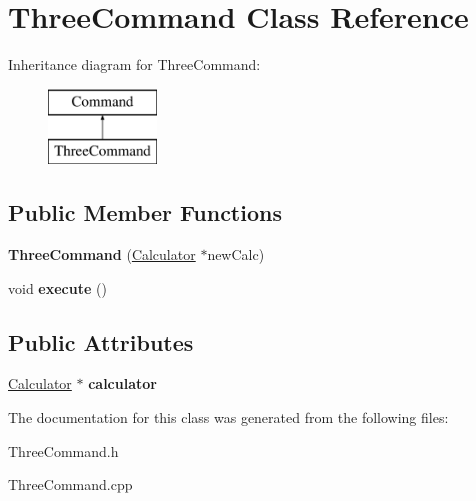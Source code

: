 \hypertarget{class_three_command}{}\section{Three\+Command Class Reference}
\label{class_three_command}
Inheritance diagram for Three\+Command\+:\begin{figure}[H]
\begin{center}
\leavevmode
\includegraphics[height=2.000000cm]{class_three_command}
\end{center}
\end{figure}
\subsection*{Public Member Functions}
\begin{DoxyCompactItemize}
\item 
\hypertarget{class_three_command_a6d1887ffb18cd3772b9164d68e86b72c}{}{\bfseries Three\+Command} (\hyperlink{class_calculator}{Calculator} $\ast$new\+Calc)\label{class_three_command_a6d1887ffb18cd3772b9164d68e86b72c}

\item 
\hypertarget{class_three_command_af8e301161be213f999f4fd49ffa4db67}{}void {\bfseries execute} ()\label{class_three_command_af8e301161be213f999f4fd49ffa4db67}

\end{DoxyCompactItemize}
\subsection*{Public Attributes}
\begin{DoxyCompactItemize}
\item 
\hypertarget{class_three_command_a8a2a28c69c47a9e7d65a0b487c41596a}{}\hyperlink{class_calculator}{Calculator} $\ast$ {\bfseries calculator}\label{class_three_command_a8a2a28c69c47a9e7d65a0b487c41596a}

\end{DoxyCompactItemize}


The documentation for this class was generated from the following files\+:\begin{DoxyCompactItemize}
\item 
Three\+Command.\+h\item 
Three\+Command.\+cpp\end{DoxyCompactItemize}
